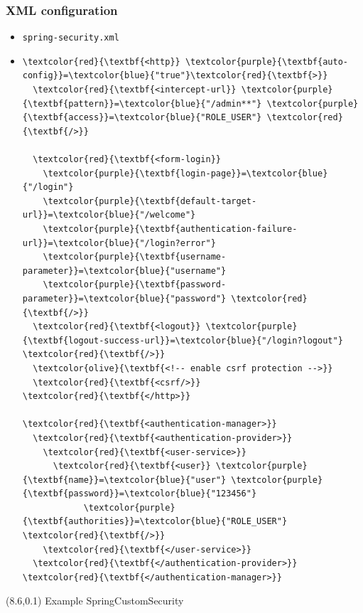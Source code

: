 \documentclass[10pt,xcolor=pdflatex, table]{beamer}
\begin{document}
\begin{frame}[fragile]\frametitle{XML configuration}
	\begin{itemize}
		\item \texttt{spring-security.xml}
        \item[]
        	\medskip
            \begin{Verbatim}[fontsize=\footnotesize, commandchars=\\\{\}]
\textcolor{red}{\textbf{<http}} \textcolor{purple}{\textbf{auto-config}}=\textcolor{blue}{"true"}\textcolor{red}{\textbf{>}}
  \textcolor{red}{\textbf{<intercept-url}} \textcolor{purple}{\textbf{pattern}}=\textcolor{blue}{"/admin**"} \textcolor{purple}{\textbf{access}}=\textcolor{blue}{"ROLE_USER"} \textcolor{red}{\textbf{/>}}

  \textcolor{red}{\textbf{<form-login}} 
    \textcolor{purple}{\textbf{login-page}}=\textcolor{blue}{"/login"}
    \textcolor{purple}{\textbf{default-target-url}}=\textcolor{blue}{"/welcome"} 
    \textcolor{purple}{\textbf{authentication-failure-url}}=\textcolor{blue}{"/login?error"} 
    \textcolor{purple}{\textbf{username-parameter}}=\textcolor{blue}{"username"}
    \textcolor{purple}{\textbf{password-parameter}}=\textcolor{blue}{"password"} \textcolor{red}{\textbf{/>}}
  \textcolor{red}{\textbf{<logout}} \textcolor{purple}{\textbf{logout-success-url}}=\textcolor{blue}{"/login?logout"}  \textcolor{red}{\textbf{/>}}
  \textcolor{olive}{\textbf{<!-- enable csrf protection -->}}
  \textcolor{red}{\textbf{<csrf/>}}
\textcolor{red}{\textbf{</http>}}

\textcolor{red}{\textbf{<authentication-manager>}}
  \textcolor{red}{\textbf{<authentication-provider>}}
    \textcolor{red}{\textbf{<user-service>}}
      \textcolor{red}{\textbf{<user}} \textcolor{purple}{\textbf{name}}=\textcolor{blue}{"user"} \textcolor{purple}{\textbf{password}}=\textcolor{blue}{"123456"}
            \textcolor{purple}{\textbf{authorities}}=\textcolor{blue}{"ROLE_USER"} \textcolor{red}{\textbf{/>}}
    \textcolor{red}{\textbf{</user-service>}}
  \textcolor{red}{\textbf{</authentication-provider>}}
\textcolor{red}{\textbf{</authentication-manager>}}
            \end{Verbatim}
	\end{itemize}
\begin{textblock}{15}(8.6,0.1)
    {\footnotesize Example SpringCustomSecurity}
\end{textblock}
\end{frame}
\end{document}
